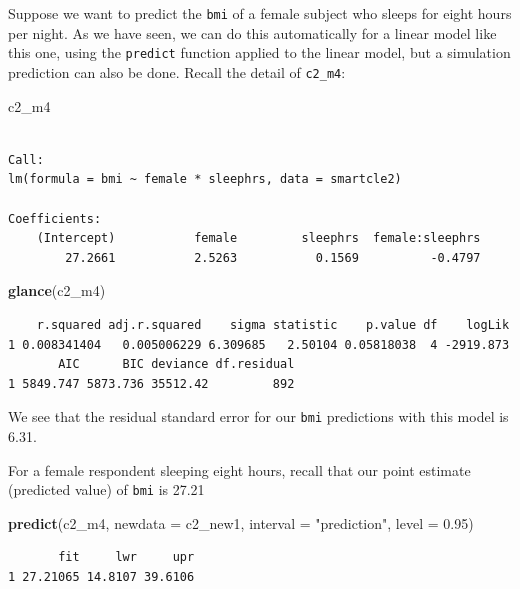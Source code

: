 \documentclass[]{book}
\newenvironment{Shaded}{\begin{snugshade}}{\end{snugshade}}
\newcommand{\KeywordTok}[1]{\textcolor[rgb]{0.13,0.29,0.53}{\textbf{#1}}}
\newcommand{\DataTypeTok}[1]{\textcolor[rgb]{0.13,0.29,0.53}{#1}}
\newcommand{\FloatTok}[1]{\textcolor[rgb]{0.00,0.00,0.81}{#1}}
\newcommand{\StringTok}[1]{\textcolor[rgb]{0.31,0.60,0.02}{#1}}
\newcommand{\NormalTok}[1]{#1}
\theoremstyle{definition}
\theoremstyle{definition}
\theoremstyle{definition}
\theoremstyle{remark}
\begin{document}
Suppose we want to predict the \texttt{bmi} of a female subject who
sleeps for eight hours per night. As we have seen, we can do this
automatically for a linear model like this one, using the
\texttt{predict} function applied to the linear model, but a simulation
prediction can also be done. Recall the detail of \texttt{c2\_m4}:

\begin{Shaded}
\begin{Highlighting}[]
\NormalTok{c2_m4}
\end{Highlighting}
\end{Shaded}

\begin{verbatim}

Call:
lm(formula = bmi ~ female * sleephrs, data = smartcle2)

Coefficients:
    (Intercept)           female         sleephrs  female:sleephrs  
        27.2661           2.5263           0.1569          -0.4797  
\end{verbatim}

\begin{Shaded}
\begin{Highlighting}[]
\KeywordTok{glance}\NormalTok{(c2_m4)}
\end{Highlighting}
\end{Shaded}

\begin{verbatim}
    r.squared adj.r.squared    sigma statistic    p.value df    logLik
1 0.008341404   0.005006229 6.309685   2.50104 0.05818038  4 -2919.873
       AIC      BIC deviance df.residual
1 5849.747 5873.736 35512.42         892
\end{verbatim}

We see that the residual standard error for our \texttt{bmi} predictions
with this model is 6.31.

For a female respondent sleeping eight hours, recall that our point
estimate (predicted value) of \texttt{bmi} is 27.21

\begin{Shaded}
\begin{Highlighting}[]
\KeywordTok{predict}\NormalTok{(c2_m4, }\DataTypeTok{newdata =}\NormalTok{ c2_new1, }\DataTypeTok{interval =} \StringTok{"prediction"}\NormalTok{, }\DataTypeTok{level =} \FloatTok{0.95}\NormalTok{)}
\end{Highlighting}
\end{Shaded}

\begin{verbatim}
       fit     lwr     upr
1 27.21065 14.8107 39.6106
\end{verbatim}
\end{document}
